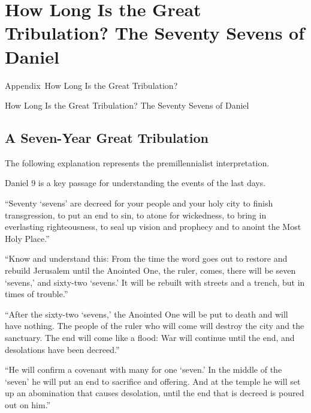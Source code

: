 {} 
\chapter*{How Long Is the Great Tribulation? The Seventy Sevens of Daniel} 
%
         {Appendix~\thechapter\quad How Long Is the Great Tribulation?}
 {\protect\numberline{\thechapter} How Long Is the Great Tribulation? The Seventy Sevens of Daniel}


\section*{A Seven-Year Great Tribulation}

The following explanation represents the premillennialist interpretation.

Daniel 9 is a key passage for understanding the events of the last days.

\begin{ScriptureBox}

\item[9:24] ``Seventy `sevens' are decreed for your people and your holy city to finish transgression, to put an end to sin, to atone for wickedness, to bring in everlasting righteousness, to seal up vision and prophecy and to anoint the Most Holy Place.''

\item[9:25] ``Know and understand this: From the time the word goes out to restore and rebuild Jerusalem until the Anointed One, the ruler, comes, there will be seven `sevens,' and sixty-two `sevens.' It will be rebuilt with streets and a trench, but in times of trouble.''

\item[9:26] ``After the sixty-two `sevens,' the Anointed One will be put to death and will have nothing. The people of the ruler who will come will destroy the city and the sanctuary. The end will come like a flood: War will continue until the end, and desolations have been decreed.''

\item[9:27] ``He will confirm a covenant with many for one `seven.' In the middle of the `seven' he will put an end to sacrifice and offering. And at the temple he will set up an abomination that causes desolation, until the end that is decreed is poured out on him.''

\end{ScriptureBox}

